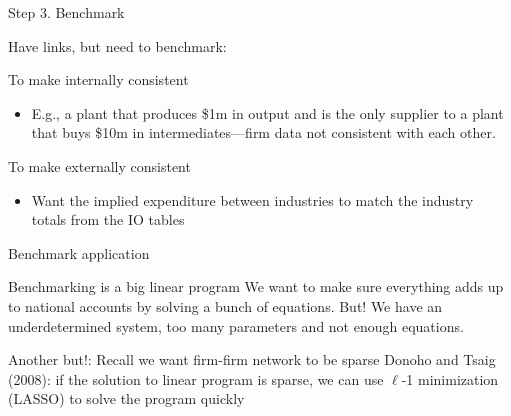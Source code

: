 \documentclass[12pt]{beamer}
\begin{document}
\begin{frame}{Step 3. Benchmark}

\begin{block}{Have links, but need to benchmark: }
\end{block}

\begin{block}{To make internally consistent}
\begin{itemize}
\item E.g., a plant that produces \$1m in output and is the only supplier to a plant that buys \$10m in intermediates---firm data not consistent with each other.
\end{itemize}
\end{block}

\begin{block}{To make externally consistent}
\begin{itemize}
\item Want the implied expenditure between industries to match the industry totals from the IO tables
\end{itemize}
\end{block}


\end{frame}


\begin{frame}{Benchmark application}

\begin{block}{Benchmarking is a big linear program}
We want to make sure everything adds up to national accounts by solving a bunch of equations. But! We have an underdetermined system, too many parameters and not enough equations.
\end{block}

\begin{block}{Another but!: Recall we want firm-firm network to be sparse}
Donoho and Tsaig (2008): if the solution to linear program is sparse, we can use $\ell$-1 minimization (LASSO) to solve the program quickly
\end{block}



\end{frame}


%
%
%
\end{document}
